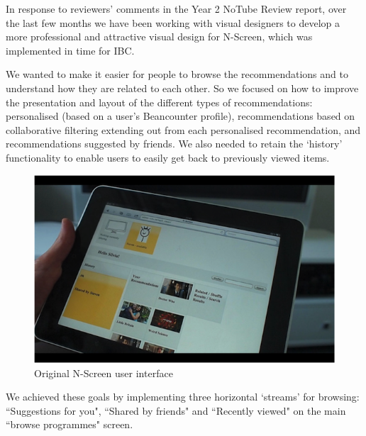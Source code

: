 \documentclass{notube}
\begin{document}
In response to reviewers' comments in the Year 2 NoTube Review report, over the last few months we have been working with visual designers to develop a more professional and attractive visual design for N-Screen, which was implemented in time for IBC. 

We wanted to make it easier for people to browse the recommendations and to understand how they are related to each other. So we focused on how to improve the presentation and layout of the different types of recommendations: personalised (based on a user's Beancounter profile), recommendations based on collaborative filtering extending out from each personalised recommendation, and recommendations suggested by friends. We also needed to retain the `history' functionality to enable users to easily get back to previously viewed items. 

\begin{figure}[htbp]
\begin{center}
\includegraphics[width=6in]{images/ns_original.png}
\caption{Original N-Screen user interface} \label{fig:nsoriginal}
\end{center}
\end{figure}

 We achieved these goals by implementing three horizontal `streams' for browsing: ``Suggestions for you", ``Shared by friends" and ``Recently viewed" on the main ``browse programmes" screen. 
 
\end{document}
